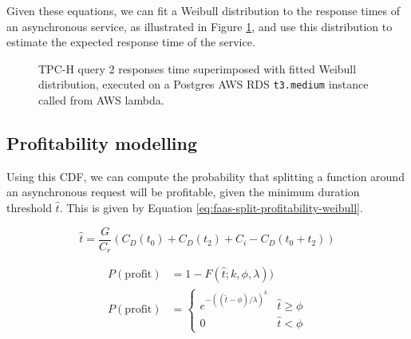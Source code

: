 Given these equations, we can fit a Weibull distribution to the response times of an asynchronous service, as illustrated in Figure \ref{fig:tpch-q2-weibull}, and use this distribution to estimate the expected response time of the service.

%        

\begin{figure}
    \begin{center}
        
    \end{center}
    \caption{TPC-H query 2 responses time superimposed with fitted Weibull distribution, executed on a Postgres AWS RDS \texttt{t3.medium} instance called from AWS lambda.}
    \label{fig:tpch-q2-weibull}
\end{figure}

\subsection{Profitability modelling}
Using this CDF, we can compute the probability that splitting a function around an asynchronous request will be profitable, given the minimum duration threshold $\hat{t}$. This is given by Equation \ref{eq:faas-split-profitability-weibull}.

\begin{equation}
\hat{t} = \frac{G}{C_r} \left( C_D(t_0) + C_D(t_2) + C_i - C_D(t_0 + t_2) \right)
\end{equation}

\begin{equation} \label{eq:faas-split-profitability-weibull}
\begin{aligned}
P(\mathrm{profit}) & = 1 - F(\hat{t}; k, \phi, \lambda)) \\
P(\mathrm{profit}) & =
    \begin{cases}
    e^{-((\hat{t} - \phi)/\lambda)^k} & \hat{t} \geq \phi \\
    0 & \hat{t} < \phi
    \end{cases}
\end{aligned}
\end{equation}

